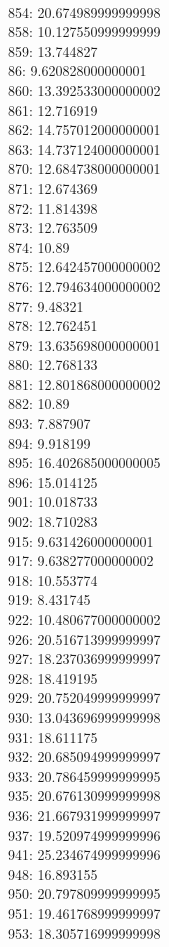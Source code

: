 \begin{multicols}{4}
  \\ 854: 20.674989999999998
  \\ 858: 10.127550999999999
  \\ 859: 13.744827
  \\ 86: 9.620828000000001
  \\ 860: 13.392533000000002
  \\ 861: 12.716919
  \\ 862: 14.757012000000001
  \\ 863: 14.737124000000001
  \\ 870: 12.684738000000001
  \\ 871: 12.674369
  \\ 872: 11.814398
  \\ 873: 12.763509
  \\ 874: 10.89
  \\ 875: 12.642457000000002
  \\ 876: 12.794634000000002
  \\ 877: 9.48321
  \\ 878: 12.762451
  \\ 879: 13.635698000000001
  \\ 880: 12.768133
  \\ 881: 12.801868000000002
  \\ 882: 10.89
  \\ 893: 7.887907
  \\ 894: 9.918199
  \\ 895: 16.402685000000005
  \\ 896: 15.014125
  \\ 901: 10.018733
  \\ 902: 18.710283
  \\ 915: 9.631426000000001
  \\ 917: 9.638277000000002
  \\ 918: 10.553774
  \\ 919: 8.431745
  \\ 922: 10.480677000000002
  \\ 926: 20.516713999999997
  \\ 927: 18.237036999999997
  \\ 928: 18.419195
  \\ 929: 20.752049999999997
  \\ 930: 13.043696999999998
  \\ 931: 18.611175
  \\ 932: 20.685094999999997
  \\ 933: 20.786459999999995
  \\ 935: 20.676130999999998
  \\ 936: 21.667931999999997
  \\ 937: 19.520974999999996
  \\ 941: 25.234674999999996
  \\ 948: 16.893155
  \\ 950: 20.797809999999995
  \\ 951: 19.461768999999997
  \\ 953: 18.305716999999998
\end{multicols}
